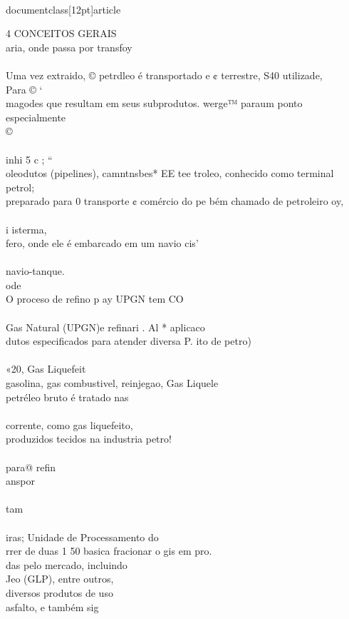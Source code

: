 \\documentclass[12pt]{article}
\begin{document}
{4 CONCEITOS GERAIS\\
aria, onde passa por transfoy\\
\\
Uma vez extraido, © petrdleo é transportado e ¢ terrestre, S40 utilizade,\\
Para © ‘\\
magodes que resultam em seus subprodutos. werge™ paraum ponto especialmente\\
©\\
\\
inhi 5 c ; “\\
oleodutos (pipelines), camntnsbes* EE tee troleo, conhecido como terminal petrol;\\
preparado para 0 transporte ¢ comércio do pe bém chamado de petroleiro oy,\\
\\
i isterma,\\
fero, onde ele é embarcado em um navio cis'\\
\\
navio-tanque.\\
ode\\
O proceso de refino p ay UPGN tem CO\\
\\
Gas Natural (UPGN)e refinari . Al * aplicaco\\
dutos especificados para atender diversa P. ito de petro)\\
\\
«20, Gas Liquefeit\\
gasolina, gas combustivel, reinjegao, Gas Liquele\\
petréleo bruto é tratado nas\\
\\
corrente, como gas liquefeito,\\
produzidos tecidos na industria petro!\\
\\
para@ refin\\
anspor\\
\\
tam\\
\\
iras; Unidade de Processamento do\\
rrer de duas 1 50 basica fracionar o gis em pro.\\
das pelo mercado, incluindo\\
Jeo (GLP), entre outros,\\
diversos produtos de uso\\
asfalto, e também sig\\
}
\end{document}
